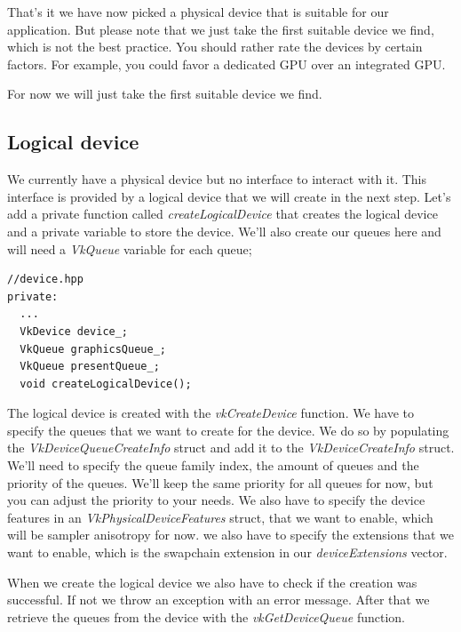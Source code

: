 \documentclass[12pt]{report} \usepackage{preamble}
\begin{document}
That's it we have now picked a physical device that is suitable for our application. But please note that
we just take the first suitable device we find, which is not the best practice. You should rather
rate the devices by certain factors. For example, you could favor a dedicated \ac{GPU} over an integrated \ac{GPU}.

For now we will just take the first suitable device we find.

\subsection{Logical device}

We currently have a physical device but no interface to interact with it. This interface is provided
by a logical device that we will create in the next step. Let's add a private function called
\textit{createLogicalDevice} that creates the logical device and a private variable to store the device.
We'll also create our queues here and will need a \textit{VkQueue} variable for each queue;

\begin{lstlisting}[Language=C++]
//device.hpp
private:
  ...
  VkDevice device_;
  VkQueue graphicsQueue_;
  VkQueue presentQueue_;
  void createLogicalDevice();
\end{lstlisting}

The logical device is created with the \textit{vkCreateDevice} function. We have to specify the
queues that we want to create for the device. We do so by populating the \textit{VkDeviceQueueCreateInfo}
struct and add it to the \textit{VkDeviceCreateInfo} struct. We'll need to specify the queue family index,
the amount of queues and the priority of the queues. We'll keep the same priority for all queues for now,
but you can adjust the priority to your needs. We also have to specify the device features in an
\textit{VkPhysicalDeviceFeatures} struct, that we want to enable, which will be sampler anisotropy for now.
we also have to specify the extensions that we want to enable,
which is the swapchain extension in our \textit{deviceExtensions} vector.

When we create the logical device we also have to check if the creation was successful. If not we throw
an exception with an error message. After that we retrieve the queues from the device with the
\textit{vkGetDeviceQueue} function.
\end{document}
